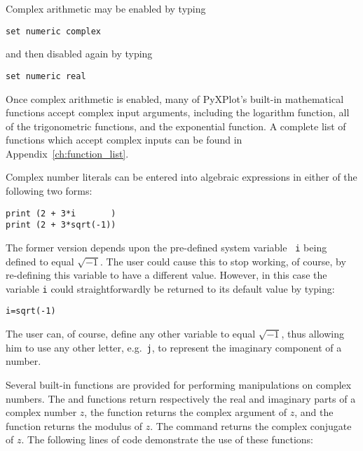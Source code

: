 \vspace{3mm}
\newline
{}
\vspace{3mm}

Complex arithmetic may be enabled by typing

\begin{verbatim}
set numeric complex
\end{verbatim}

\noindent and then disabled again by typing

\begin{verbatim}
set numeric real
\end{verbatim}

Once complex arithmetic is enabled, many of PyXPlot's built-in mathematical
functions accept complex input arguments, including the logarithm function, all
of the trigonometric functions, and the exponential function.  A complete list
of functions which accept complex inputs can be found in
Appendix~\ref{ch:function_list}.

Complex number literals can be entered into algebraic expressions in either of
the following two forms:

\begin{verbatim}
print (2 + 3*i       )
print (2 + 3*sqrt(-1))
\end{verbatim}

\noindent The former version depends upon the pre-defined system variable {\tt
i} being defined to equal $\sqrt{-1}$. The user could cause this to stop working,
of course, by re-defining this variable to have a different value.  However, in
this case the variable {\tt i} could straightforwardly be returned to its
default value by typing:

\begin{verbatim}
i=sqrt(-1)
\end{verbatim}

\noindent The user can, of course, define any other variable to equal
$\sqrt{-1}$, thus allowing him to use any other letter, e.g.\ {\tt j}, to
represent the imaginary component of a number.

Several built-in functions are provided for performing manipulations on complex
numbers. The  and  functions return respectively
the real and imaginary parts of a complex number $z$, the 
function returns the complex argument of $z$, and the  function
returns the modulus of $z$.  The  command returns the
complex conjugate of $z$. The following lines of code demonstrate the use of
these functions:

